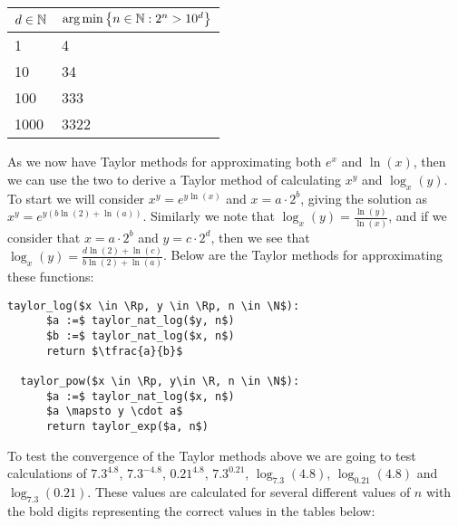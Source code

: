 \begin{center}
\begin{tabular}{|l|l|}
\hline
\(d \in \mathbb{N}\) 
	& \(\textrm{arg}\min\left\{n \in \mathbb{N} : 2^n > 10^d\right\}\)\\\hline
1 & 4\\\hline
10 & 34\\\hline
100 & 333 \\\hline
1000 & 3322\\\hline
\end{tabular}
\end{center}

As we now have Taylor methods for approximating both \(e^x\) and \(\ln(x)\), then we can use the two to derive a Taylor method of calculating \(x^y\) and \(\log_x(y)\). To start we will consider \(x^y = e^{y\ln(x)}\) and \(x = a\cdot2^b\), giving the solution as \(x^y = e^{y(b\ln(2) + \ln(a))}\). Similarly we note that \(\log_x(y) = \frac{\ln(y)}{\ln(x)}\), and if we consider that \(x = a\cdot2^b\) and \(y = c\cdot2^d\), then we see that \(\log_x(y) = \frac{d\ln(2) + \ln(c)}{b\ln(2) + \ln(a)}\). Below are the Taylor methods for approximating these functions:

\begin{lstlisting}[caption={Taylor Method for calculating \(x^y\) and \(\log_x(y)\)},label={PCD_"taylor pow/log"}]
  taylor_log($x \in \Rp, y \in \Rp, n \in \N$):
      $a :=$ taylor_nat_log($y, n$)
      $b :=$ taylor_nat_log($x, n$)
      return $\tfrac{a}{b}$
  
  taylor_pow($x \in \Rp, y\in \R, n \in \N$):
      $a :=$ taylor_nat_log($x, n$)
      $a \mapsto y \cdot a$
      return taylor_exp($a, n$)
\end{lstlisting}

To test the convergence of the Taylor methods above we are going to test calculations of \(7.3^{4.8}\), \(7.3^{-4.8}\), \(0.21^{4.8}\), \(7.3^{0.21}\), \(\log_{7.3}(4.8)\), \(\log_{0.21}(4.8)\) and \(\log_{7.3}(0.21)\). These values are calculated for several different values of \(n\) with the bold digits representing the correct values in the tables below:

